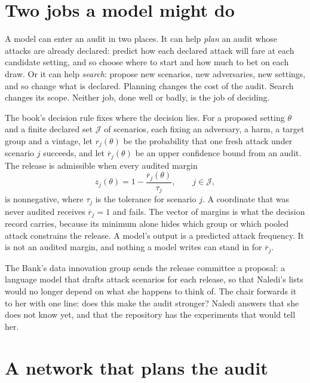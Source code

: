 \section{Two jobs a model might do}\label{c14:sec-jobs}

A model can enter an audit in two places. It can help \emph{plan} an audit whose
attacks are already declared: predict how each declared attack will fare at each
candidate setting, and so choose where to start and how much to bet on each draw. Or
it can help \emph{search}: propose new scenarios, new adversaries, new settings, and
so change what is declared. Planning changes the cost of the audit. Search changes
its scope. Neither job, done well or badly, is the job of deciding.

The book's decision rule fixes where the decision lies. For a proposed setting
$\theta$ and a finite declared set $\mathcal J$ of scenarios, each fixing an adversary,
a harm, a target group and a vintage, let $r_j(\theta)$ be the probability that one
fresh attack under scenario $j$ succeeds, and let $\overline r_j(\theta)$ be an upper
confidence bound from an audit. The release is admissible when every audited margin
\begin{equation}\label{c14:eq-margin}
z_j(\theta) = 1 - \frac{\overline r_j(\theta)}{\tau_j}, \qquad j \in \mathcal J,
\end{equation}
is nonnegative, where $\tau_j$ is the tolerance for scenario $j$. A coordinate that
was never audited receives $\overline r_j = 1$ and fails. The vector of margins is what
the decision record carries, because its minimum alone hides which group or which
pooled attack constrains the release.
A model's output is a predicted attack frequency. It is not an audited margin, and
nothing a model writes can stand in for $\overline r_j$.

The Bank's data innovation group sends the release committee a proposal: a language
model that drafts attack scenarios for each release, so that Naledi's lists would no
longer depend on what she happens to think of. The chair forwards it to her with one
line: does this make the audit stronger? Naledi answers that she does not know yet,
and that the repository has the experiments that would tell her.

\section{A network that plans the audit}\label{c14:sec-pipeline}

